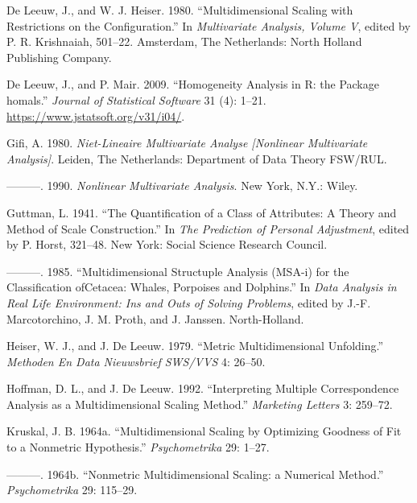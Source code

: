 \documentclass[
  12pt,
  letterpaper,
  DIV=11,
  numbers=noendperiod]{scrartcl}
\newlength{\cslhangindent}
\newenvironment{CSLReferences}[2] %
 {\begin{list}{}{%
  \setlength{\itemindent}{0pt}
  \setlength{\leftmargin}{0pt}
  \setlength{\parsep}{0pt}
  \ifodd #1
   \setlength{\leftmargin}{\cslhangindent}
   \setlength{\itemindent}{-1\cslhangindent}
  \fi
  \setlength{\itemsep}{#2\baselineskip}}}
 {\end{list}}
\begin{document}
\begin{CSLReferences}{1}{0}
De Leeuw, J., and W. J. Heiser. 1980. {``Multidimensional Scaling with
Restrictions on the Configuration.''} In \emph{Multivariate Analysis,
Volume {V}}, edited by P. R. Krishnaiah, 501--22. Amsterdam, The
Netherlands: North Holland Publishing Company.

De Leeuw, J., and P. Mair. 2009. {``{Homogeneity Analysis in {R}: the
Package homals}.''} \emph{Journal of Statistical Software} 31 (4):
1--21. \url{https://www.jstatsoft.org/v31/i04/}.

Gifi, A. 1980. \emph{Niet-Lineaire Multivariate Analyse {[}Nonlinear
Multivariate Analysis{]}}. Leiden, The Netherlands: Department of Data
Theory FSW/RUL.

---------. 1990. \emph{Nonlinear Multivariate Analysis}. New York, N.Y.:
Wiley.

Guttman, L. 1941. {``{The Quantification of a Class of Attributes: A
Theory and Method of Scale Construction}.''} In \emph{The Prediction of
Personal Adjustment}, edited by P. Horst, 321--48. New York: Social
Science Research Council.

---------. 1985. {``Multidimensional Structuple Analysis (MSA-i) for the
Classification ofCetacea: Whales, Porpoises and Dolphins.''} In
\emph{Data Analysis in Real Life Environment: Ins and Outs of Solving
Problems}, edited by J.-F. Marcotorchino, J. M. Proth, and J. Janssen.
North-Holland.

Heiser, W. J., and J. De Leeuw. 1979. {``Metric Multidimensional
Unfolding.''} \emph{Methoden En Data Nieuwsbrief SWS/VVS} 4: 26--50.

Hoffman, D. L., and J. De Leeuw. 1992. {``Interpreting Multiple
Correspondence Analysis as a Multidimensional Scaling Method.''}
\emph{Marketing Letters} 3: 259--72.

Kruskal, J. B. 1964a. {``{Multidimensional Scaling by Optimizing
Goodness of Fit to a Nonmetric Hypothesis}.''} \emph{Psychometrika} 29:
1--27.

---------. 1964b. {``{Nonmetric Multidimensional Scaling: a Numerical
Method}.''} \emph{Psychometrika} 29: 115--29.


\end{CSLReferences}
\end{document}
